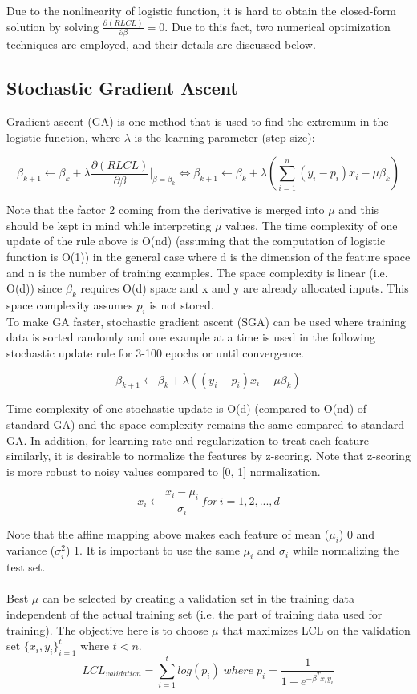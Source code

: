 \documentclass[a4paper]{article}
\newcommand{\pder}[2]{\frac{\partial#1}{\partial#2}}
\begin{document}
 Due to the nonlinearity of logistic function, it is hard to obtain the closed-form solution by solving $\pder{(RLCL)}{\beta} = 0$. Due to this fact, two numerical optimization techniques are employed, and their details are discussed below.
 
\subsection{Stochastic Gradient Ascent}
 
Gradient ascent (GA) is one method that is used to find the extremum in the logistic function, where $\lambda$ is the learning parameter (step size):
 
 $$\beta_{k+1} \longleftarrow \beta_k + \lambda \pder{(RLCL)}{\beta} \bigg|_{\beta=\beta_k} \Longleftrightarrow \beta_{k+1} \longleftarrow \beta_k + \lambda (\sum_{i=1}^{n} (y_i - p_i) x_i - \mu \beta_k) $$
 
Note that the factor 2 coming from the derivative is merged into $\mu$ and this should be kept in mind while interpreting $\mu$ values. The time complexity of one update of the rule above is O(nd) (assuming that the computation of logistic function is O(1)) in the general case where d is the dimension of the feature space and n is the number of training examples. The space complexity is linear (i.e. O(d)) since $\beta_k$ requires O(d) space and x and y are already allocated inputs. This space complexity assumes $p_i$ is not stored. \\
 
To make GA faster, stochastic gradient ascent (SGA) can be used  where training data is sorted randomly and one example at a time is used in the following stochastic update rule for 3-100 epochs \cite{Label2} or until convergence.
 
 $$\beta_{k+1} \longleftarrow \beta_k + \lambda ((y_i - p_i) x_i - \mu \beta_k)$$

Time complexity of one stochastic update is O(d) (compared to O(nd) of standard GA) and the space complexity remains the same compared to standard GA. In addition, for learning rate and regularization to treat each feature similarly, it is desirable to normalize the features by z-scoring. Note that z-scoring is more robust to noisy values compared to [0, 1] normalization.

$$ x_i \longleftarrow \frac{x_i - \mu_i}{\sigma_i}\, for\, i=1,2,...,d$$

Note that the affine mapping above makes each feature of mean ($\mu_i$) 0 and variance ($\sigma_i^2$) 1. It is important to use the same $\mu_i$ and $\sigma_i$ while normalizing the test set. 
\\\\
Best $\mu$ can be selected by creating a validation set in the training data independent of the actual training set (i.e. the part of training data used for training). The objective here is to choose $\mu$ that maximizes LCL on the validation set $\{x_i , y_i \}_{i=1}^{t}$ where $t < n$.
$$LCL_{validation} = \sum_{i=1}^{t}log(p_i)\; where\; p_i = \frac{1}{1+e^{-\beta^{T}x_i y_i}}$$
\end{document}
